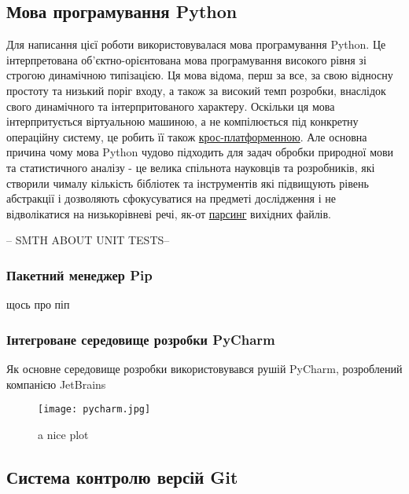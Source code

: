 \subsection{Мова програмування Python}
Для написання цієї роботи використовувалася мова програмування Python. Це інтерпретована
об'єктно-орієнтована мова програмування високого рівня зі строгою динамічною типізацією.
Ця мова відома, перш за все, за свою відносну простоту та низький поріг входу,
а також за високий темп розробки, внаслідок свого динамічного та інтерпритованого характеру.
Оскільки ця мова інтерпритується віртуальною машиною, а не компілюється під конкретну
операційну систему, це робить її також \hyperlink{term1}{крос-платформенною}.
Але основна причина чому мова Python чудово підходить для задач обробки природної мови
та статистичного аналізу - це велика спільнота науковців та розробників, які створили чималу
кількість бібліотек та інструментів які підвищують рівень абстракції і дозволяють сфокусуватися
на предметі дослідження і не відволікатися на низькорівневі речі, як-от
\hyperlink{term2}{парсинг} вихідних файлів.

-- SMTH ABOUT UNIT TESTS--

\subsubsection{Пакетний менеджер Pip}
щось про піп

\subsubsection{Інтегроване середовище розробки PyCharm}
Як основне середовище розробки використовувався рушій PyCharm, розроблений компанією JetBrains

\begin{figure}[h]
    \centering
    \noindent\texttt{[image: pycharm.jpg]}
    \caption{a nice plot}
\end{figure}


\subsection{Система контролю версій Git}

